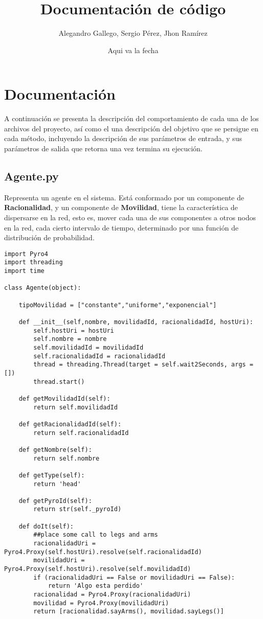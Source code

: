 \documentclass{article}
\begin{document}
\title{Documentación de código}
\author{Alegandro Gallego, Sergio Pérez, Jhon Ramírez}
\date{Aqui va la fecha}
\maketitle

\section{Documentación}
A continuación se presenta la descripción del comportamiento de cada una de los archivos del proyecto, así como el una descripción del objetivo que se persigue en cada método, incluyendo la descripción de sus parámetros de entrada, y sus parámetros de salida que retorna una vez termina su ejecución.

\subsection{Agente.py}
Representa un agente en el sistema. Está conformado por un componente de \textbf{Racionalidad}, y un componente de \textbf{Movilidad}, tiene la característica de dispersarse en la red, esto es, mover cada una de sus componentes a otros nodos en la red, cada cierto intervalo de tiempo, determinado por una función de distribución de probabilidad.\\

\begin{lstlisting}
import Pyro4
import threading
import time

class Agente(object):
    
    tipoMovilidad = ["constante","uniforme","exponencial"]    
    
    def __init__(self,nombre, movilidadId, racionalidadId, hostUri):
        self.hostUri = hostUri
        self.nombre = nombre
        self.movilidadId = movilidadId
        self.racionalidadId = racionalidadId
        thread = threading.Thread(target = self.wait2Seconds, args = [])
        thread.start()

    def getMovilidadId(self):
        return self.movilidadId

    def getRacionalidadId(self):
        return self.racionalidadId
        
    def getNombre(self):
        return self.nombre
        
    def getType(self):
        return 'head'

    def getPyroId(self):
        return str(self._pyroId)

    def doIt(self):
        ##place some call to legs and arms
        racionalidadUri = Pyro4.Proxy(self.hostUri).resolve(self.racionalidadId)
        movilidadUri =  Pyro4.Proxy(self.hostUri).resolve(self.movilidadId)
        if (racionalidadUri == False or movilidadUri == False):
            return 'Algo esta perdido'
        racionalidad = Pyro4.Proxy(racionalidadUri)
        movilidad = Pyro4.Proxy(movilidadUri)
        return [racionalidad.sayArms(), movilidad.sayLegs()]
\end{lstlisting}
\end{document}
